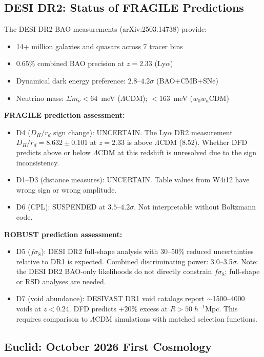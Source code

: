 \documentclass[11pt,a4paper]{article}
\newcommand{\LCDM}{$\Lambda$CDM}
\begin{document}
\subsection{DESI DR2: Status of FRAGILE Predictions}

The DESI DR2 BAO measurements (arXiv:2503.14738) provide:
\begin{itemize}[nosep]
\item 14+ million galaxies and quasars across 7 tracer bins
\item $0.65\%$ combined BAO precision at $z = 2.33$ (Ly$\alpha$)
\item Dynamical dark energy preference: $2.8$--$4.2\sigma$
  (BAO+CMB+SNe)
\item Neutrino mass: $\Sigma m_\nu < 64$~meV (\LCDM);
  $< 163$~meV ($w_0 w_a$CDM)
\end{itemize}

\textbf{FRAGILE prediction assessment:}
\begin{itemize}[nosep]
\item D4 ($D_H/r_d$ sign change): UNCERTAIN. The Ly$\alpha$ DR2
  measurement $D_H/r_d = 8.632 \pm 0.101$ at $z = 2.33$ is above
  \LCDM{} ($8.52$). Whether DFD predicts above or below \LCDM{} at
  this redshift is unresolved due to the sign inconsistency.
\item D1--D3 (distance measures): UNCERTAIN. Table values from W4i12
  have wrong sign or wrong amplitude.
\item D6 (CPL): SUSPENDED at $3.5$--$4.2\sigma$. Not interpretable
  without Boltzmann code.
\end{itemize}

\textbf{ROBUST prediction assessment:}
\begin{itemize}[nosep]
\item D5 ($f\sigma_8$): DESI DR2 full-shape analysis with $30$--$50\%$
  reduced uncertainties relative to DR1 is expected. Combined
  discriminating power: 3.0--3.5$\sigma$. Note: the DESI DR2 BAO-only
  likelihoods do not directly constrain $f\sigma_8$; full-shape or
  RSD analyses are needed.
\item D7 (void abundance): DESIVAST DR1 void catalogs report
  $\sim$1500--4000 voids at $z < 0.24$. DFD predicts $+20\%$ excess
  at $R > 50\;h^{-1}$Mpc. This requires comparison to \LCDM{}
  simulations with matched selection functions.
\end{itemize}

\subsection{Euclid: October 2026 First Cosmology}
\end{document}
